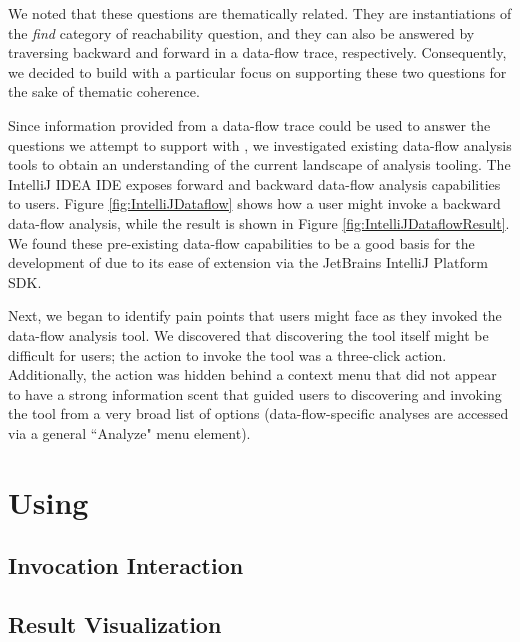 \par We noted that these questions are thematically related. They are instantiations 
of the \textit{find} category of reachability question, and they can also be
answered by traversing backward and forward in a data-flow trace, respectively.
Consequently, we decided to build \toolname{} with a particular focus on
supporting these two questions for the sake of thematic coherence.

\par Since information provided from a data-flow trace could be used to answer
the questions we attempt to support with \toolname{}, we investigated existing
data-flow analysis tools to obtain an understanding of the current landscape
of analysis tooling.
The IntelliJ IDEA \ac{IDE} exposes forward and backward data-flow analysis
capabilities to users.
Figure \ref{fig:IntelliJDataflow} shows how a user might invoke a backward 
data-flow analysis, while the result is shown in
Figure \ref{fig:IntelliJDataflowResult}.
We found these pre-existing data-flow capabilities to be a good basis for the 
development of \toolname{} due to its ease of extension via the JetBrains 
IntelliJ Platform \ac{SDK}.

\par Next, we began to identify pain points that users might face as they
invoked the data-flow analysis tool.
We discovered that discovering the tool itself might be difficult for
users; the action to invoke the tool was a three-click action.
Additionally, the action was hidden behind a context menu that did not appear
to have a strong information scent that guided users to discovering and invoking
the tool from a very broad list of options (\ie data-flow-specific analyses
are accessed via a general ``Analyze" menu element).


\section{Using \toolname{}}
\label{sec:UsingReachHover}

\subsection{Invocation Interaction}
\label{subsection:InvocationInteraction}


\subsection{Result Visualization}
\label{subsection:ResultVisualization}

